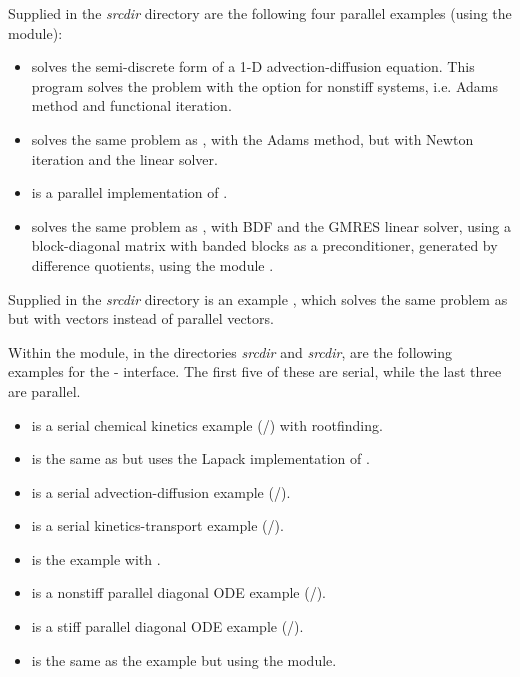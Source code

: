 \vspace{0.2in}\noindent Supplied in the
{\em srcdir} directory are the following
four parallel examples (using the {\nvecp} module):
\begin{itemize}
\item {} solves the semi-discrete form of a 1-D
  advection-diffusion equation.
  \newline
  This program solves the problem with the option for nonstiff
  systems, i.e. Adams method and functional iteration.
\item {}
  solves the same problem as , with the Adams method,
  but with Newton iteration and the  linear solver.
\item {}
  is a parallel implementation of .
\item {}
  solves the same problem as , with BDF and the GMRES linear
  solver, using a block-diagonal matrix with banded blocks as a preconditioner, 
  generated by difference quotients, using the module {\cvbbdpre}.
\end{itemize}

\vspace{0.2in}\noindent Supplied in the
{\em srcdir} directory is an example
, which solves the same problem as
 but with {\hypre} vectors instead of
{\sundials} parallel vectors.

\vspace{0.2in}\noindent
Within the {\fcvode} module, in the directories 
{\em srcdir} and
{\em srcdir}, are the following examples for
the {\F}-{\CC} interface.  The first five of these are serial, while
the last three are parallel.
\begin{itemize}
\item {} is a serial chemical kinetics example (/{\cvdense})
  with rootfinding.
\item {} is the same as  but uses the Lapack
  implementation of {\cvdense}.
\item {} is a serial advection-diffusion example (/{\cvband}).
\item {} is a serial kinetics-transport example (/{\cvspgmr}).
\item {} is the  example with {\fcvbp}.
\item {} is a nonstiff parallel diagonal ODE example
  (/).
\item {} is a stiff parallel diagonal ODE example (/{\cvspgmr}).
\item {} is the same as the  example
       but using the {\fcvbbd} module.
\end{itemize}

